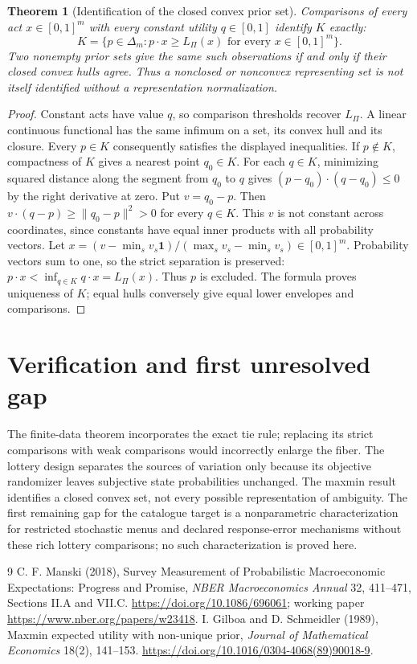\documentclass[11pt]{article}
\newtheorem{theorem}{Theorem}
\theoremstyle{remark}
\begin{document}
\begin{theorem}[Identification of the closed convex prior set]
Comparisons of every act $x\in[0,1]^m$ with every constant utility
$q\in[0,1]$ identify $K$ exactly:
\[
 K=\{p\in\Delta_m:p\cdot x\geq L_\Pi(x)
                        \text{ for every }x\in[0,1]^m\}.
\]
Two nonempty prior sets give the same such observations if and only if
their closed convex hulls agree. Thus a nonclosed or nonconvex representing
set is not itself identified without a representation normalization.
\end{theorem}
\begin{proof}
Constant acts have value $q$, so comparison thresholds recover $L_\Pi$.
A linear continuous functional has the same infimum on a set, its convex
hull and its closure. Every $p\in K$ consequently satisfies the displayed
inequalities. If $p\notin K$, compactness of $K$ gives a nearest point
$q_0\in K$. For each $q\in K$, minimizing squared distance along the segment
from $q_0$ to $q$ gives
$(p-q_0)\cdot(q-q_0)\leq0$ by the right derivative at zero.
Put $v=q_0-p$. Then
$v\cdot(q-p)\geq\|q_0-p\|^2>0$ for every $q\in K$.
This $v$ is not constant across coordinates, since constants have equal
inner products with all probability vectors. Let
$x=(v-\min_s v_s\mathbf 1)/(\max_s v_s-\min_s v_s)\in[0,1]^m$.
Probability vectors sum to one, so the strict separation is preserved:
$p\cdot x<\inf_{q\in K}q\cdot x=L_\Pi(x)$. Thus $p$ is excluded.
The formula proves uniqueness of $K$; equal hulls conversely give equal
lower envelopes and comparisons.
\end{proof}

\section{Verification and first unresolved gap}
The finite-data theorem incorporates the exact tie rule; replacing its
strict comparisons with weak comparisons would incorrectly enlarge the
fiber. The lottery design separates the sources of variation only because
its objective randomizer leaves subjective state probabilities unchanged.
The maxmin result identifies a closed convex set, not every possible
representation of ambiguity. The first remaining gap for the catalogue
target is a nonparametric characterization for restricted stochastic menus
and declared response-error mechanisms without these rich lottery
comparisons; no such characterization is proved here.

\begin{thebibliography}{9}
 C. F. Manski (2018), Survey Measurement of Probabilistic
Macroeconomic Expectations: Progress and Promise, \emph{NBER Macroeconomics
Annual} 32, 411--471, Sections II.A and VII.C.
\url{https://doi.org/10.1086/696061}; working paper
\url{https://www.nber.org/papers/w23418}.
 I. Gilboa and D. Schmeidler (1989), Maxmin expected utility
with non-unique prior, \emph{Journal of Mathematical Economics} 18(2),
141--153. \url{https://doi.org/10.1016/0304-4068(89)90018-9}.
\end{thebibliography}
\end{document}
